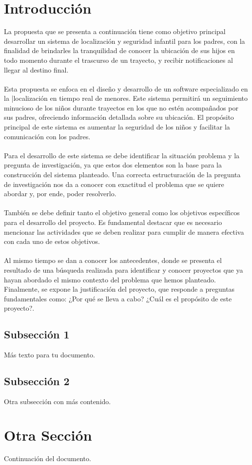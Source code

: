 \documentclass[12pt,onehalfspacing]{report}
\begin{document}
\chapter*{Introducción}
La propuesta que se presenta a continuación tiene como objetivo principal desarrollar un sistema de localización y seguridad infantil para los padres, con la finalidad de brindarles la tranquilidad de conocer la ubicación de sus hijos en todo momento durante el trascurso de un trayecto, y recibir notificaciones al llegar al destino final.\\\\
Esta propuesta se enfoca en el diseño y desarrollo de un software especializado en la |localización en tiempo real de menores. Este sistema permitirá un seguimiento minucioso de los niños durante trayectos en los que no estén acompañados por sus padres, ofreciendo información detallada sobre su ubicación. El propósito principal de este sistema es aumentar la seguridad de los niños y facilitar la comunicación con los padres.\\\\
Para el desarrollo de este sistema se debe identificar 
la situación problema y la pregunta de investigación, ya que estos dos elementos son la base para la construcción del sistema planteado. Una correcta estructuración de la pregunta de investigación nos da a conocer con exactitud el problema que se quiere abordar y, por ende, poder resolverlo.\\\\
También se debe definir tanto el objetivo general como los objetivos específicos para el desarrollo del proyecto. Es fundamental destacar que es necesario mencionar las actividades que se deben realizar para cumplir de manera efectiva con cada uno de estos objetivos.\\\\
Al mismo tiempo se dan a conocer los antecedentes, donde se presenta el resultado de una búsqueda realizada para identificar y conocer proyectos que ya hayan abordado el mismo contexto del problema que hemos planteado. Finalmente, se expone la justificación del proyecto, que responde a preguntas fundamentales como: ¿Por qué se lleva a cabo? ¿Cuál es el propósito de este proyecto?.


\section*{Subsección 1}
Más texto para tu documento.

\section*{Subsección 2}
Otra subsección con más contenido.

\chapter*{Otra Sección}
Continuación del documento.
\end{document}
